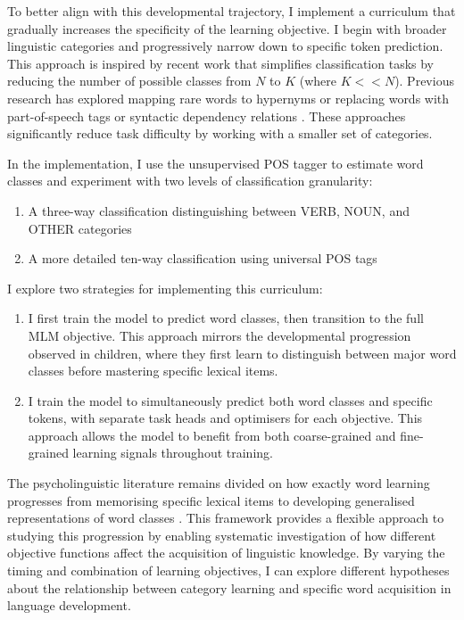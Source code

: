 To better align with this developmental trajectory, I implement a curriculum that gradually increases the specificity of the learning objective. I begin with broader linguistic categories and progressively narrow down to specific token prediction. This approach is inspired by recent work that simplifies classification tasks by reducing the number of possible classes from $N$ to $K$ (where $K << N$). Previous research has explored mapping rare words to hypernyms \citep{bai2022better} or replacing words with part-of-speech tags \citep{wang2023language} or syntactic dependency relations \citep{cui2022lert}. These approaches significantly reduce task difficulty by working with a smaller set of categories.

In the implementation, I use the unsupervised POS tagger to estimate word classes and experiment with two levels of classification granularity:
\begin{enumerate}
    \item A three-way classification distinguishing between VERB, NOUN, and OTHER categories
    \item A more detailed ten-way classification using universal POS tags
\end{enumerate}

I explore two strategies for implementing this curriculum:

\begin{enumerate}
    \item {} I first train the model to predict word classes, then transition to the full MLM objective. This approach mirrors the developmental progression observed in children, where they first learn to distinguish between major word classes before mastering specific lexical items.
    
    \item {} I train the model to simultaneously predict both word classes and specific tokens, with separate task heads and optimisers for each objective. This approach allows the model to benefit from both coarse-grained and fine-grained learning signals throughout training.
\end{enumerate}

The psycholinguistic literature remains divided on how exactly word learning progresses from memorising specific lexical items to developing generalised representations of word classes \citep{clark2015first}. This framework provides a flexible approach to studying this progression by enabling systematic investigation of how different objective functions affect the acquisition of linguistic knowledge. By varying the timing and combination of learning objectives, I can explore different hypotheses about the relationship between category learning and specific word acquisition in language development.

